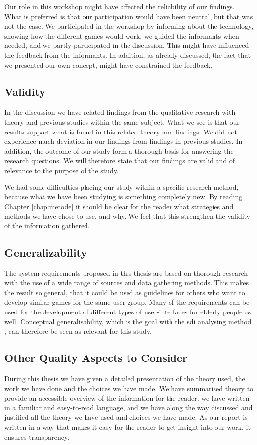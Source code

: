 Our role in this workshop might have affected the reliability of our findings. What is preferred is that our participation would have been neutral, but that was not the case. We participated in the workshop by informing about the technology, showing how the different games would work, we guided the informants when needed, and we partly participated in the discussion. This might have influenced the feedback from the informants. In addition, as already discussed, the fact that we presented our own concept, might have constrained the feedback. 


\subsection{Validity}

In the discussion we have related findings from the qualitative research with theory and previous studies within the same subject. What we see is that our results support what is found in this related theory and findings. We did not experience much deviation in our findings from findings in previous studies. In addition, the outcome of our study form a thorough basis for answering the research questions. We will therefore state that our findings are valid and of relevance to the purpose of the study. 

We had some difficulties placing our study within a specific research method, because what we have been studying is something completely new. By reading Chapter \ref{chap:metode} it should be clear for the reader what strategies and methods we have chose to use, and why. We feel that this strengthen the validity of the information gathered. 
    
\subsection{Generalizability}    
The system requirements proposed in this thesis are based on thorough research with the use of a wide range of sources and data gathering methods. This makes the result so general, that it could be used as guidelines for others who want to develop similar games for the same user group. Many of the requirements can be used for the development of different types of user-interfaces for elderly people as well. Conceptual generalisability, which is the goal with the \ac{sdi} analysing method \cite{tjora}, can therefore be seen as relevant for this study. 


\subsection{Other Quality Aspects to Consider}
During this thesis we have given a detailed presentation of the theory used, the work we have done and the choices we have made. We have summarised theory to provide an accessible overview of the information for the reader, we have written in a familiar and easy-to-read language, and we have along the way discussed and justified all the theory we have used and choices we have made. As our report is written in a way that makes it easy for the reader to get insight into our work, it ensures transparency.

